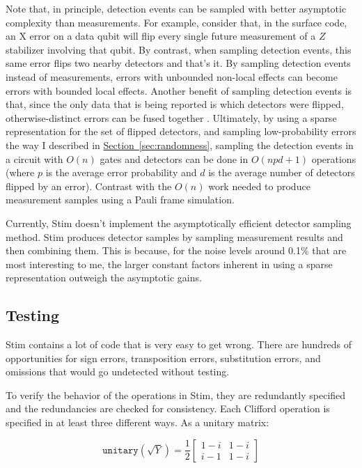 \documentclass[onecolumn,unpublished]{quantumarticle}
\theoremstyle{definition}
\theoremstyle{definition}
\theoremstyle{definition}
\renewcommand{\sec}[1]{\hyperref[sec:#1]{Section~\ref*{sec:#1}}}
\begin{document}
Note that, in principle, detection events can be sampled with better asymptotic complexity than measurements.
For example, consider that, in the surface code, an X error on a data qubit will flip every single future measurement of a $Z$ stabilizer involving that qubit.
By contrast, when sampling detection events, this same error flips two nearby detectors and that's it.
By sampling detection events instead of measurements, errors with unbounded non-local effects can become errors with bounded local effects.
Another benefit of sampling detection events is that, since the only data that is being reported is which detectors were flipped, otherwise-distinct errors can be fused together \cite{chao2020optimization}.
Ultimately, by using a sparse representation for the set of flipped detectors, and sampling low-probability errors the way I described in \sec{randomness}, sampling the detection events in a circuit with $O(n)$ gates and detectors can be done in $O(npd + 1)$ operations (where $p$ is the average error probability and $d$ is the average number of detectors flipped by an error).
Contrast with the $O(n)$ work needed to produce measurement samples using a Pauli frame simulation.

Currently, Stim doesn't implement the asymptotically efficient detector sampling method.
Stim produces detector samples by sampling measurement results and then combining them.
This is because, for the noise levels around 0.1\% that are most interesting to me, the larger constant factors inherent in using a sparse representation outweigh the asymptotic gains.

\subsection{Testing}

Stim contains a lot of code that is very easy to get wrong.
There are hundreds of opportunities for sign errors, transposition errors, substitution errors, and omissions that would go undetected without testing.

To verify the behavior of the operations in Stim, they are redundantly specified and the redundancies are checked for consistency.
Each Clifford operation is specified in at least three different ways.
As a unitary matrix:

$$
\texttt{unitary}(\sqrt{Y}) = \frac{1}{2}\begin{bmatrix}
    1 - i & 1 - i \\
    i - 1 & 1 - i
\end{bmatrix}
$$
\end{document}
